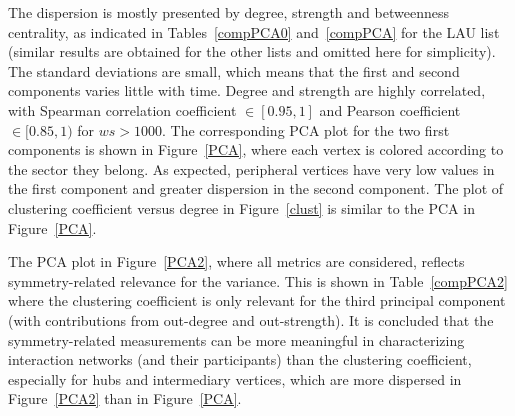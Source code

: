 \documentclass[%
 aip,
 jmp,%
 amsmath,amssymb,
 reprint,%
]{revtex4-1}
\begin{document}
The dispersion is mostly presented by degree, strength and betweenness centrality, as indicated in Tables~\ref{compPCA0} and~\ref{compPCA} for the LAU list (similar results are obtained for the other lists and omitted here for simplicity). The standard deviations are small, which means that the first and second components varies little with time.
 Degree and strength are highly correlated, with Spearman correlation coefficient $\in [0.95,1]$ and Pearson coefficient $\in [0.85,1)$ for $ws>1000$. The corresponding PCA plot for the two first components is shown in Figure~\ref{PCA}, where each vertex is colored according to the sector they belong. As expected, peripheral vertices have very low values in the first component and greater dispersion in the second component. 
The plot of clustering coefficient versus degree in Figure~\ref{clust} is similar to the PCA in Figure~\ref{PCA}.

The PCA plot in Figure~\ref{PCA2}, where all metrics are considered, reflects symmetry-related relevance for the variance. This is shown in Table~\ref{compPCA2}  where the clustering coefficient is only relevant for the third principal component (with contributions from out-degree and out-strength). It is concluded that the symmetry-related measurements can be more meaningful in characterizing interaction networks (and their participants) than the clustering coefficient, especially for hubs and intermediary vertices, which are more dispersed in Figure~\ref{PCA2} than in Figure~\ref{PCA}. 
\end{document}
